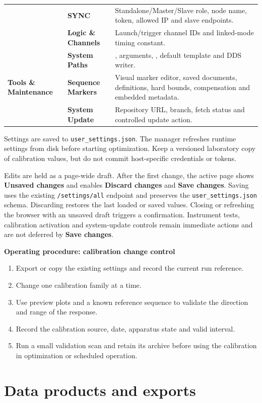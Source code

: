 \documentclass[11pt,oneside,openany]{book}
\newcommand{\code}[1]{\texttt{\detokenize{#1}}}
\newcommand{\ui}[1]{\textbf{#1}}
\newcommand{\pathcode}[1]{\nolinkurl{#1}}
\newenvironment{procedure}[1]
  {\par\medskip\noindent\textbf{Operating procedure: #1}\par\smallskip\begin{enumerate}}
  {\end{enumerate}\medskip}
\begin{document}
\begin{longtable}{>{\raggedright\arraybackslash\bfseries}p{}
  >{\raggedright\arraybackslash\bfseries}p{}
  >{\raggedright\arraybackslash}p{}}
& SYNC & Standalone/Master/Slave role, node name, token, allowed IP and slave endpoints.\\
& Logic \& Channels & Launch/trigger channel IDs and linked-mode timing constant.\\
& System Paths & \code{tmot4}, arguments, \code{cmot4}, default template and DDS writer.\\
\midrule
Tools \& Maintenance & Sequence Markers & Visual marker editor, saved documents,
definitions, hard bounds, compensation and embedded metadata.\\
& System Update & Repository URL, branch, fetch status and controlled update action.\\
\bottomrule
\end{longtable}

Settings are saved to \pathcode{user_settings.json}. The manager refreshes runtime settings
from disk before starting optimization. Keep a versioned laboratory copy of calibration
values, but do not commit host-specific credentials or tokens.

Edits are held as a page-wide draft. After the first change, the active page shows
\ui{Unsaved changes} and enables \ui{Discard changes} and \ui{Save changes}. Saving uses
the existing \pathcode{/settings/all} endpoint and preserves the
\pathcode{user_settings.json} schema. Discarding restores the last loaded or saved values.
Closing or refreshing the browser with an unsaved draft triggers a confirmation. Instrument
tests, calibration activation and system-update controls remain immediate actions and are
not deferred by \ui{Save changes}.

\begin{procedure}{calibration change control}
  \item Export or copy the existing settings and record the current run reference.
  \item Change one calibration family at a time.
  \item Use preview plots and a known reference sequence to validate the direction and
  range of the response.
  \item Record the calibration source, date, apparatus state and valid interval.
  \item Run a small validation scan and retain its archive before using the calibration in
  optimization or scheduled operation.
\end{procedure}

\chapter{Data products and exports}\label{ch:data}
\end{document}
